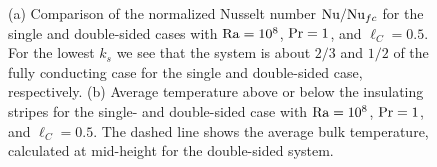 \begin{figure}
\centering
{}
{}
\label{figure8}
\caption{%
(a) Comparison of the normalized Nusselt
number $\text{Nu}/\text{Nu}_{fc}$ for the single and double-sided cases with
$\text{Ra}=10^8$, $\text{Pr}=1$, and $\ell_C=0.5$.  For the lowest $k_s$ we see
that the system is about $2/3$ and $1/2$ of the fully conducting case for
the single and double-sided case, respectively.  (b) Average temperature
above or below the insulating stripes for the single- and double-sided
case with $\text{Ra}=10^8$, $\text{Pr}=1$, and $\ell_C=0.5$.  The dashed line shows
the average bulk temperature, calculated at mid-height for the double-sided
system.}
\end{figure}

